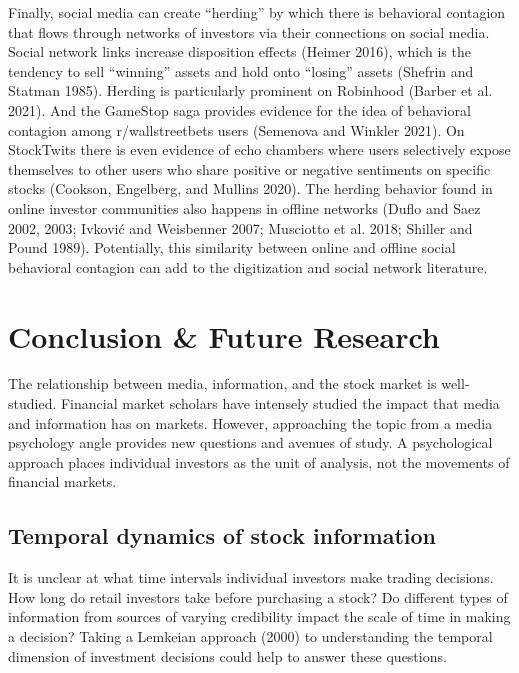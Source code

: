 \documentclass[12pt,]{article}
\begin{document}
Finally, social media can create ``herding'' by which there is
behavioral contagion that flows through networks of investors via their
connections on social media. Social network links increase disposition
effects (Heimer 2016), which is the tendency to sell ``winning'' assets
and hold onto ``losing'' assets (Shefrin and Statman 1985). Herding is
particularly prominent on Robinhood (Barber et al. 2021). And the
GameStop saga provides evidence for the idea of behavioral contagion
among r/wallstreetbets users (Semenova and Winkler 2021). On StockTwits
there is even evidence of echo chambers where users selectively expose
themselves to other users who share positive or negative sentiments on
specific stocks (Cookson, Engelberg, and Mullins 2020). The herding
behavior found in online investor communities also happens in offline
networks (Duflo and Saez 2002, 2003; Ivković and Weisbenner 2007;
Musciotto et al. 2018; Shiller and Pound 1989). Potentially, this
similarity between online and offline social behavioral contagion can
add to the digitization and social network literature.

\hypertarget{conclusion-future-research}{%
\section{Conclusion \& Future
Research}\label{conclusion-future-research}}

The relationship between media, information, and the stock market is
well-studied. Financial market scholars have intensely studied the
impact that media and information has on markets. However, approaching
the topic from a media psychology angle provides new questions and
avenues of study. A psychological approach places individual investors
as the unit of analysis, not the movements of financial markets.

\hypertarget{temporal-dynamics-of-stock-information}{%
\subsection{Temporal dynamics of stock
information}\label{temporal-dynamics-of-stock-information}}

It is unclear at what time intervals individual investors make trading
decisions. How long do retail investors take before purchasing a stock?
Do different types of information from sources of varying credibility
impact the scale of time in making a decision? Taking a Lemkeian
approach (2000) to understanding the temporal dimension of investment
decisions could help to answer these questions.
\end{document}
